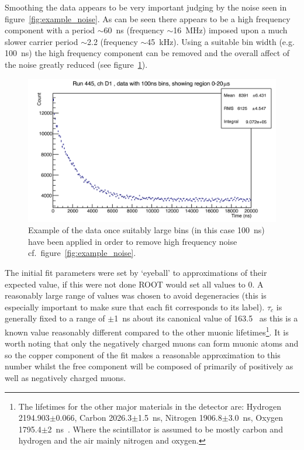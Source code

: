 Smoothing the data appears to be very important judging by the noise seen in figure~\ref{fig:example_noise}. As can be seen there appears to be a high frequency component with a period $\sim$60~ns (frequency $\sim$16~MHz) imposed upon a much slower carrier period $\sim$2.2\mus{} (frequency $\sim$45~kHz). Using a suitable bin width (e.g. 100~ns) the high frequency component can be removed and the overall affect of the noise greatly reduced (see figure~\ref{fig:example_smoothing}).

\begin{figure}[htbp]
    \centering
        \includegraphics[width=\textwidth]{images/example_smoothing.png}
    \caption{Example of the data once suitably large bins (in this case 100~ns) have been applied in order to remove high frequency noise cf.\ figure~\ref{fig:example_noise}.}
    \label{fig:example_smoothing}
\end{figure}

The initial fit parameters were set by `eyeball' to approximations of their expected value, if this were not done ROOT would set all values to 0. A reasonably large range of values was chosen to avoid degeneracies (this is especially important to make sure that each fit corresponds to its label). $\tau_{c}$ is generally fixed to a range of $\pm$1~ns about its canonical value of 163.5~\cite{PhysRevC.35.2212} as this is a known value reasonably different compared to the other muonic lifetimes\footnote{The lifetimes for the other major materials in the detector are: Hydrogen 2194.903$\pm$0.066, Carbon 2026.3$\pm$1.5~ns, Nitrogen 1906.8$\pm$3.0~ns, Oxygen 1795.4$\pm$2~ns~\cite{PhysRevC.35.2212}. Where the scintillator is assumed to be mostly carbon and hydrogen and the air mainly nitrogen and oxygen.}. It is worth noting that only the negatively charged muons can form muonic atoms and so the copper component of the fit makes a reasonable approximation to this number whilst the free component will be composed of primarily of positively as well as negatively charged muons.

